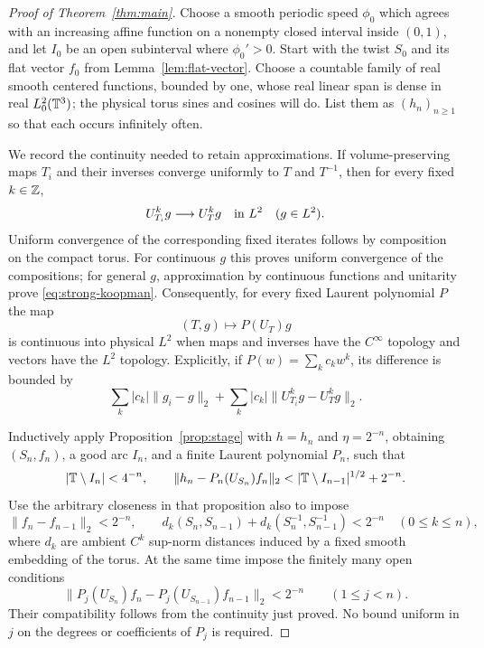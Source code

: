 \begin{proof}[Proof of Theorem~\ref{thm:main}]
Choose a smooth periodic speed $\phi_0$ which agrees with an increasing
affine function on a nonempty closed interval inside $(0,1)$, and let
$I_0$ be an open subinterval where $\phi_0'>0$.  Start with the twist
$S_0$ and its flat vector $f_0$ from Lemma~\ref{lem:flat-vector}.
Choose a countable family of real smooth centered functions, bounded
by one, whose real linear span is dense in real $L^2_0(\mathbb T^3)$; the
physical torus sines and cosines will do.  List them as $(h_n)_{n\ge1}$
so that each occurs infinitely often.

We record the continuity needed to retain approximations.  If
volume-preserving maps $T_i$ and their inverses converge uniformly to
$T$ and $T^{-1}$, then for every fixed $k\in\mathbb Z$,
\begin{equation}\label{eq:strong-koopman}
 U_{T_i}^kg\longrightarrow U_T^kg\quad\hbox{in }L^2
 \quad(g\in L^2).
\end{equation}
Uniform convergence of the corresponding fixed iterates follows by
composition on the compact torus.  For continuous $g$ this proves
uniform convergence of the compositions; for general $g$, approximation
by continuous functions and unitarity prove \eqref{eq:strong-koopman}.
Consequently, for every fixed Laurent polynomial $P$ the map
\[
 (T,g)\longmapsto P(U_T)g
\]
is continuous into physical $L^2$ when maps and inverses have the
$C^\infty$ topology and vectors have the $L^2$ topology.  Explicitly,
if $P(w)=\sum_k c_kw^k$, its difference is bounded by
\[
 \sum_k|c_k|\|g_i-g\|_2+
 \sum_k|c_k|\|U_{T_i}^kg-U_T^kg\|_2.
\]

Inductively apply Proposition~\ref{prop:stage} with $h=h_n$ and
$\eta=2^{-n}$, obtaining $(S_n,f_n)$, a good arc $I_n$, and a finite
Laurent polynomial $P_n$, such that
\begin{equation}\label{eq:stage-polynomial}
 |\T\setminus I_n|<4^{-n},\qquad
 \|h_n-P_n(U_{S_n})f_n\|_2
 <|\T\setminus I_{n-1}|^{1/2}+2^{-n}.
\end{equation}
Use the arbitrary closeness in that proposition also to impose
\[
 \|f_n-f_{n-1}\|_2<2^{-n},
 \qquad
 d_k(S_n,S_{n-1})+d_k(S_n^{-1},S_{n-1}^{-1})<2^{-n}
 \quad(0\le k\le n),
\]
where $d_k$ are ambient $C^k$ sup-norm distances induced by a fixed
smooth embedding of the torus. At the same time impose
the finitely many open conditions
\begin{equation}\label{eq:retain-polynomial}
 \|P_j(U_{S_n})f_n-P_j(U_{S_{n-1}})f_{n-1}\|_2<2^{-n}
 \qquad(1\le j<n).
\end{equation}
Their compatibility follows from the continuity just proved.  No bound
uniform in $j$ on the degrees or coefficients of $P_j$ is required.


\end{proof}
